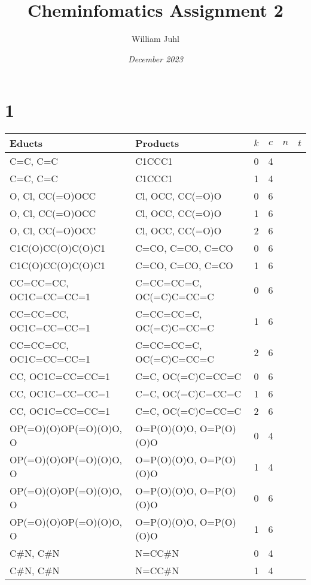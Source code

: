 \documentclass{article}
\title{\textbf{Cheminfomatics Assignment 2}}
\author{William Juhl}
\date{\textit{December 2023}}
\begin{document}
\thispagestyle{empty}

\maketitle
\newpage
\thispagestyle{empty}


\newpage
\section*{1}

\begin{table}[h]
    \centering
    \begin{tabular}{ll|cccc}\\
        Educts & Products & $k$ & $c$ & $n$ & $t$\\\hline
        C=C, C=C & C1CCC1 & 0 & 4 & & \\
        C=C, C=C & C1CCC1 & 1 & 4 & & \\
        O, Cl, CC(=O)OCC & Cl, OCC, CC(=O)O & 0 & 6 \\
        O, Cl, CC(=O)OCC & Cl, OCC, CC(=O)O & 1 & 6 \\
        O, Cl, CC(=O)OCC & Cl, OCC, CC(=O)O & 2 & 6 \\
        C1C(O)CC(O)C(O)C1 & C=CO, C=CO, C=CO  & 0 & 6 & & \\
        C1C(O)CC(O)C(O)C1 & C=CO, C=CO, C=CO  & 1 & 6 & & \\
        CC=CC=CC, OC1C=CC=CC=1 & C=CC=CC=C, OC(=C)C=CC=C & 0 & 6 & & \\
        CC=CC=CC, OC1C=CC=CC=1 & C=CC=CC=C, OC(=C)C=CC=C & 1 & 6 & & \\
        CC=CC=CC, OC1C=CC=CC=1 & C=CC=CC=C, OC(=C)C=CC=C & 2 & 6 & & \\
        CC, OC1C=CC=CC=1 & C=C, OC(=C)C=CC=C & 0 & 6 & & \\
        CC, OC1C=CC=CC=1 & C=C, OC(=C)C=CC=C & 1 & 6 & & \\
        CC, OC1C=CC=CC=1 & C=C, OC(=C)C=CC=C & 2 & 6 & & \\
        OP(=O)(O)OP(=O)(O)O, O & O=P(O)(O)O, O=P(O)(O)O  & 0 & 4 & & \\
        OP(=O)(O)OP(=O)(O)O, O & O=P(O)(O)O, O=P(O)(O)O  & 1 & 4 & & \\
        OP(=O)(O)OP(=O)(O)O, O & O=P(O)(O)O, O=P(O)(O)O  & 0 & 6 & & \\
        OP(=O)(O)OP(=O)(O)O, O & O=P(O)(O)O, O=P(O)(O)O  & 1 & 6 & & \\
        C\#N, C\#N & N=CC\#N & 0 & 4 & & \\
        C\#N, C\#N & N=CC\#N & 1 & 4 & & \\
    \end{tabular}
\end{table}
\end{document}
